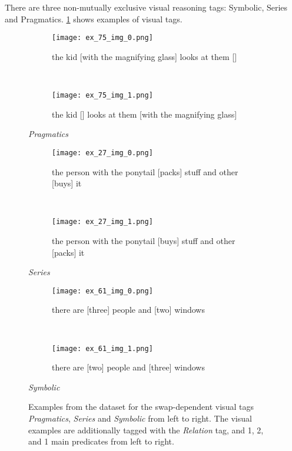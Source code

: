 There are three non-mutually exclusive visual reasoning tags: Symbolic, Series and Pragmatics. \cref{fig:dataset-examples-visual} shows examples of visual tags.

\begin{figure}[ht]
\centering
    \begin{minipage}{.30\textwidth}
        \begin{subfigure}{\textwidth}
        \centering
        \texttt{[image: ex\_75\_img\_0.png]}
        \caption{the kid [with the magnifying glass] looks at them []}
        \end{subfigure}\\
        \begin{subfigure}{\textwidth}
        \centering
        \texttt{[image: ex\_75\_img\_1.png]}
        \caption{the kid [] looks at them [with the magnifying glass]}
        \end{subfigure}%
        \caption*{\textit{Pragmatics}}
    \end{minipage}
    \hfill
    \begin{minipage}{.30\textwidth}
        \begin{subfigure}{\textwidth}
        \centering
        \texttt{[image: ex\_27\_img\_0.png]}
        \caption{the person with the ponytail [packs] stuff and other [buys] it}
        \end{subfigure}\\
        \begin{subfigure}{\textwidth}
        \centering
        \texttt{[image: ex\_27\_img\_1.png]}
        \caption{the person with the ponytail [buys] stuff and other [packs] it}
        \end{subfigure}%
        \caption*{\textit{Series}}
    \end{minipage}
    \hfill
    \begin{minipage}{.30\textwidth}
        \begin{subfigure}{\textwidth}
        \centering
        \texttt{[image: ex\_61\_img\_0.png]}
        \caption{there are [three] people and [two] windows}
        \end{subfigure}\\
        \begin{subfigure}{\textwidth}
        \centering
        \texttt{[image: ex\_61\_img\_1.png]}
        \caption{there are [two] people and [three] windows}
        \end{subfigure}%
        \caption*{\textit{Symbolic}}
    \end{minipage}
    \caption{Examples from the dataset for the swap-dependent visual tags \textit{Pragmatics}, \textit{Series} and \textit{Symbolic} from left to right. The visual examples are additionally tagged with the \textit{Relation} tag, and 1, 2, and 1 main predicates from left to right.}
    \label{fig:dataset-examples-visual}
\end{figure}

